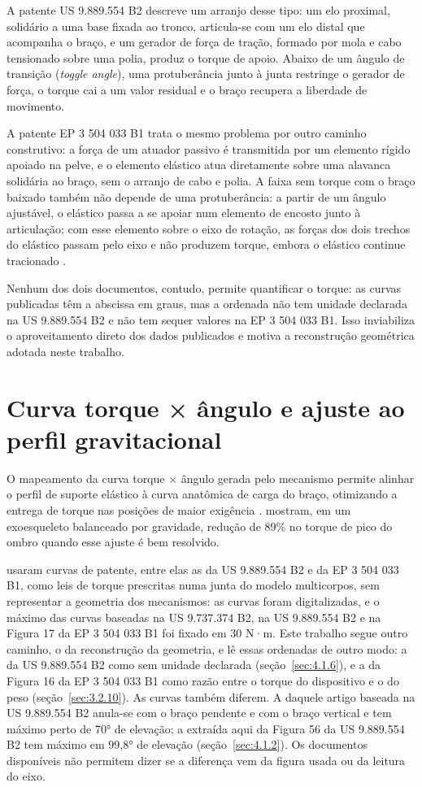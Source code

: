 A patente US 9.889.554 B2 \cite{vanengelhoven2018} descreve um arranjo desse tipo: um elo proximal, solidário a uma base fixada ao tronco, articula-se com um elo distal que acompanha o braço, e um gerador de força de tração, formado por mola e cabo tensionado sobre uma polia, produz o torque de apoio. Abaixo de um ângulo de transição (\textit{toggle angle}), uma protuberância junto à junta restringe o gerador de força, o torque cai a um valor residual e o braço recupera a liberdade de movimento.

A patente EP 3 504 033 B1 \cite{mizera2023} trata o mesmo problema por outro caminho construtivo: a força de um atuador passivo é transmitida por um elemento rígido apoiado na pelve, e o elemento elástico atua diretamente sobre uma alavanca solidária ao braço, sem o arranjo de cabo e polia. A faixa sem torque com o braço baixado também não depende de uma protuberância: a partir de um ângulo ajustável, o elástico passa a se apoiar num elemento de encosto junto à articulação; com esse elemento sobre o eixo de rotação, as forças dos dois trechos do elástico passam pelo eixo e não produzem torque, embora o elástico continue tracionado \cite{mizera2023}.

Nenhum dos dois documentos, contudo, permite quantificar o torque: as curvas publicadas têm a abscissa em graus, mas a ordenada não tem unidade declarada na US 9.889.554 B2 e não tem sequer valores na EP 3 504 033 B1. Isso inviabiliza o aproveitamento direto dos dados publicados e motiva a reconstrução geométrica adotada neste trabalho.

\section{Curva torque × ângulo e ajuste ao perfil gravitacional}\label{sec:2.4}

O mapeamento da curva torque × ângulo gerada pelo mecanismo permite alinhar o perfil de suporte elástico à curva anatômica de carga do braço, otimizando a entrega de torque nas posições de maior exigência \cite{okabe2026}. \textcite{palazzi2022} mostram, em um exoesqueleto balanceado por gravidade, redução de 89\% no torque de pico do ombro quando esse ajuste é bem resolvido.

\textcite{okabe2026} usaram curvas de patente, entre elas as da US 9.889.554 B2 e da EP 3 504 033 B1, como leis de torque prescritas numa junta do modelo multicorpos, sem representar a geometria dos mecanismos: as curvas foram digitalizadas, e o máximo das curvas baseadas na US 9.737.374 B2, na US 9.889.554 B2 e na Figura 17 da EP 3 504 033 B1 foi fixado em 30 N·m. Este trabalho segue outro caminho, o da reconstrução da geometria, e lê essas ordenadas de outro modo: a da US 9.889.554 B2 como sem unidade declarada (seção~\ref{sec:4.1.6}), e a da Figura 16 da EP 3 504 033 B1 como razão entre o torque do dispositivo e o do peso (seção~\ref{sec:3.2.10}). As curvas também diferem. A daquele artigo baseada na US 9.889.554 B2 anula-se com o braço pendente e com o braço vertical e tem máximo perto de 70° de elevação; a extraída aqui da Figura 56 da US 9.889.554 B2 tem máximo em 99,8° de elevação (seção~\ref{sec:4.1.2}). Os documentos disponíveis não permitem dizer se a diferença vem da figura usada ou da leitura do eixo.

